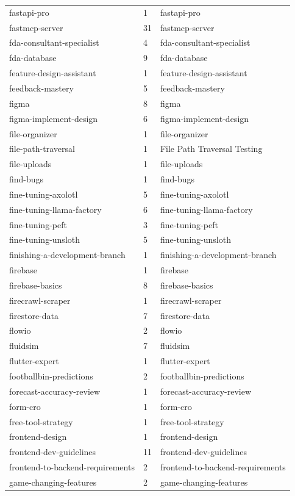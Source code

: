 \begin{longtable}{@{}lll@{}}
fastapi-pro & 1 & fastapi-pro\\
fastmcp-server & 31 & fastmcp-server\\
fda-consultant-specialist & 4 & fda-consultant-specialist\\
fda-database & 9 & fda-database\\
feature-design-assistant & 1 & feature-design-assistant\\
feedback-mastery & 5 & feedback-mastery\\
figma & 8 & figma\\
figma-implement-design & 6 & figma-implement-design\\
file-organizer & 1 & file-organizer\\
file-path-traversal & 1 & File Path Traversal Testing\\
file-uploads & 1 & file-uploads\\
find-bugs & 1 & find-bugs\\
fine-tuning-axolotl & 5 & fine-tuning-axolotl\\
fine-tuning-llama-factory & 6 & fine-tuning-llama-factory\\
fine-tuning-peft & 3 & fine-tuning-peft\\
fine-tuning-unsloth & 5 & fine-tuning-unsloth\\
finishing-a-development-branch & 1 & finishing-a-development-branch\\
firebase & 1 & firebase\\
firebase-basics & 8 & firebase-basics\\
firecrawl-scraper & 1 & firecrawl-scraper\\
firestore-data & 7 & firestore-data\\
flowio & 2 & flowio\\
fluidsim & 7 & fluidsim\\
flutter-expert & 1 & flutter-expert\\
footballbin-predictions & 2 & footballbin-predictions\\
forecast-accuracy-review & 1 & forecast-accuracy-review\\
form-cro & 1 & form-cro\\
free-tool-strategy & 1 & free-tool-strategy\\
frontend-design & 1 & frontend-design\\
frontend-dev-guidelines & 11 & frontend-dev-guidelines\\
frontend-to-backend-requirements & 2 & frontend-to-backend-requirements\\
game-changing-features & 2 & game-changing-features\\

\end{longtable}
